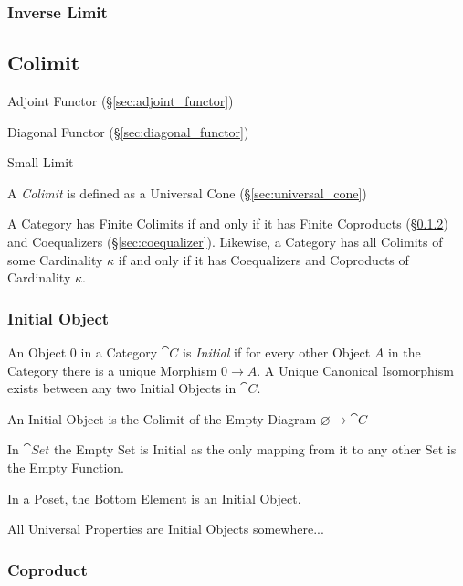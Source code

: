 \subsubsection{Inverse Limit}\label{sec:inverse_limit}



\subsection{Colimit} \label{sec:colimit}

Adjoint Functor (\S\ref{sec:adjoint_functor})

Diagonal Functor (\S\ref{sec:diagonal_functor})

Small Limit

A \emph{Colimit} is defined as a Universal Cone
(\S\ref{sec:universal_cone})

A Category has Finite Colimits if and only if it has Finite Coproducts
(\S\ref{sec:coproduct}) and Coequalizers (\S\ref{sec:coequalizer}).
Likewise, a Category has all Colimits of some Cardinality $\kappa$ if
and only if it has Coequalizers and Coproducts of Cardinality
$\kappa$.



\subsubsection{Initial Object}\label{sec:initial_object}

An Object $0$ in a Category $\cat{C}$ is \emph{Initial} if for
every other Object $A$ in the Category there is a unique Morphism $0
\rightarrow A$. A Unique Canonical Isomorphism exists between any two
Initial Objects in $\cat{C}$.

An Initial Object is the Colimit of the Empty Diagram $\varnothing
\rightarrow \cat{C}$

In $\cat{Set}$ the Empty Set is Initial as the only mapping from it
to any other Set is the Empty Function.

In a Poset, the Bottom Element is an Initial Object.

All Universal Properties are Initial Objects somewhere...



\subsubsection{Coproduct}\label{sec:coproduct}

